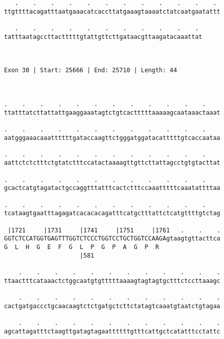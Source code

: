\documentclass{article}
\begin{document}
\begin{Verbatim}
   .    .    .    .    .    .    .    .    .    .    .    . 
ttgttttacagatttaatgaaacatcaccttatgaaagtaaaatctatcaatgaatattt
                                                            
   .    .    .    .    .    .    .    .    .    .    . 
tatttaatagccttactttttgtattgttcttgataacgttaagatacaaattat
                                                       
                                                       
 
Exon 30 | Start: 25666 | End: 25710 | Length: 44



.    .    .    .    .    .    .    .    .    .    .    .    
ttatttatcttattattgaaggaaatagtctgtcactttttaaaaagcaataaactaaat
                                                            
.    .    .    .    .    .    .    .    .    .    .    .    
aatgggaaacaaattttttgataccaagttctgggatggatacatttttgtcaccaataa
                                                            
.    .    .    .    .    .    .    .    .    .    .    .    
aattctctctttctgtatctttccatactaaaagttgttcttattagcctgtgtacttat
                                                            
.    .    .    .    .    .    .    .    .    .    .    .    
gcactcatgtagatactgccaggtttatttcactctttccaaatttttcaaatattttaa
                                                            
.    .    .    .    .    .    .    .    .    .    .    .    
tcataagtgaatttagagatcacacacagatttcatgctttattctcatgttttgtctag
                                                            
 |1721     |1731     |1741     |1751     |1761   .    .    .
GGTCTCCATGGTGAGTTTGGTCTCCCTGGTCCTGCTGGTCCAAGAgtaagtgttacttca
G  L  H  G  E  F  G  L  P  G  P  A  G  P  R                 
                     |581                                   
  
    .    .    .    .    .    .    .    .    .    .    .    .
ttaactttcataaactctggcaatgtgtttttaaaagtagtagtgctttctccttaaagc
                                                            
    .    .    .    .    .    .    .    .    .    .    .    .
cactgatgaccctgcaacaagtctctgatgctcttctatagtcaaatgtaatctgtagaa
                                                            
    .    .    .    .    .    .    .    .    .    .    .    .
agcattagatttctaagttgatagtagaattttttgtttcattgctcatatttcctattc
                                                            

\end{Verbatim}
\end{document}
